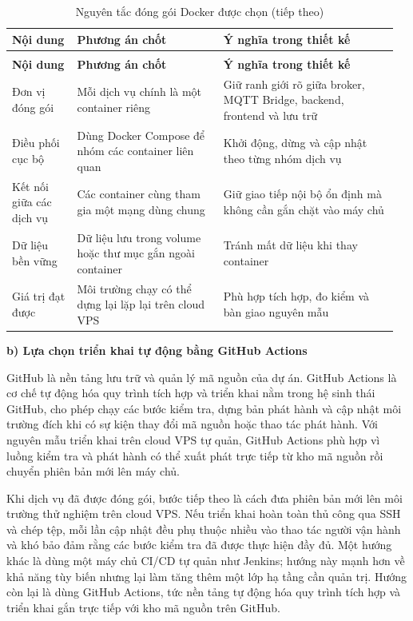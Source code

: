 \documentclass[a4paper]{extarticle}
\newcommand{\thesissettableid}[2]{%
  \renewcommand{\thetable}{#1}%
  \renewcommand{\theHtable}{#2}%
}
\begin{document}
{\thesissettableid{3.40}{condensed-bang-3-40-nguyen-tac-dong-goi-docker-duoc-chon}
\def\LTcaptype{table}
\begin{longtable}{|L{0.166\linewidth}|L{0.36\linewidth}|L{0.432\linewidth}|}
\caption{Nguyên tắc đóng gói Docker được chọn}\label{tab:condensed-bang-3-40-nguyen-tac-dong-goi-docker-duoc-chon}\\
\hline
\textbf{Nội dung} & \textbf{Phương án chốt} & \textbf{Ý nghĩa trong thiết kế} \\
\hline
\endfirsthead
\caption[]{Nguyên tắc đóng gói Docker được chọn (tiếp theo)}\\
\hline
\textbf{Nội dung} & \textbf{Phương án chốt} & \textbf{Ý nghĩa trong thiết kế} \\
\hline
\endhead
\endfoot
\endlastfoot
Đơn vị đóng gói & Mỗi dịch vụ chính là một container riêng & Giữ ranh giới rõ giữa broker, MQTT Bridge, backend, frontend và lưu trữ \\\hline
Điều phối cục bộ & Dùng Docker Compose để nhóm các container liên quan & Khởi động, dừng và cập nhật theo từng nhóm dịch vụ \\\hline
Kết nối giữa các dịch vụ & Các container cùng tham gia một mạng dùng chung & Giữ giao tiếp nội bộ ổn định mà không cần gắn chặt vào máy chủ \\\hline
Dữ liệu bền vững & Dữ liệu lưu trong volume hoặc thư mục gắn ngoài container & Tránh mất dữ liệu khi thay container \\\hline
Giá trị đạt được & Môi trường chạy có thể dựng lại lặp lại trên cloud VPS & Phù hợp tích hợp, đo kiểm và bàn giao nguyên mẫu \\\hline
\end{longtable}
}

\textbf{b) Lựa chọn triển khai tự động bằng GitHub Actions}

GitHub là nền tảng lưu trữ và quản lý mã nguồn của dự án. GitHub Actions là cơ
chế tự động hóa quy trình tích hợp và triển khai nằm trong hệ sinh thái GitHub,
cho phép chạy các bước kiểm tra, dựng bản phát hành và cập nhật môi trường đích
khi có sự kiện thay đổi mã nguồn hoặc thao tác phát hành. Với nguyên mẫu triển
khai trên cloud VPS tự quản, GitHub Actions phù hợp vì luồng kiểm tra và phát
hành có thể xuất phát trực tiếp từ kho mã nguồn rồi chuyển phiên bản mới lên máy
chủ.

Khi dịch vụ đã được đóng gói, bước tiếp theo là cách đưa phiên bản mới lên môi
trường thử nghiệm trên cloud VPS. Nếu triển khai hoàn toàn thủ công qua
SSH và chép tệp, mỗi lần cập nhật đều phụ thuộc nhiều vào thao tác người vận
hành và khó bảo đảm rằng các bước kiểm tra đã được thực hiện đầy đủ. Một hướng
khác là dùng một máy chủ CI/CD tự quản như Jenkins; hướng này mạnh hơn về khả
năng tùy biến nhưng lại làm tăng thêm một lớp hạ tầng cần quản trị. Hướng còn
lại là dùng GitHub Actions, tức nền tảng tự động hóa quy trình tích hợp và triển
khai gắn trực tiếp với kho mã nguồn trên GitHub.
\end{document}
